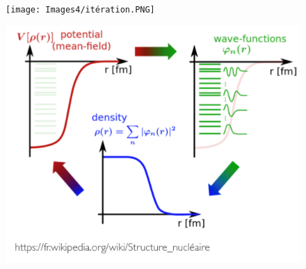 \begin{figure}[H]
    \centering
    \texttt{[image: Images4/itération.PNG]}
\end{figure}
\begin{figure}[H]
    \centering
    \includegraphics[scale = 1.2]{Images4/schéma_itération.PNG}
\end{figure}
